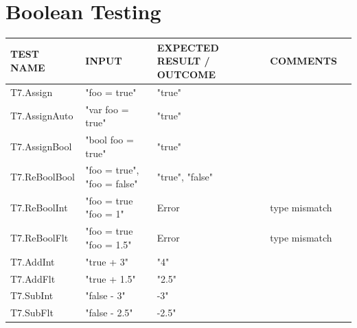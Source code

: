 \documentclass[a4paper, oneside, 11pt]{report}
\begin{document}
    \section{Boolean Testing}
    \label{BoolTest}
    \begin{tabular}{|p{1.5in}|p{1.5in}|p{1.6in}|p{1.6in}|p{2.4in}|}
        \hline
        TEST NAME       & INPUT                     & EXPECTED RESULT / OUTCOME              & COMMENTS                                \\
        \hline
        T7.Assign                         & "foo = true"                            & "true"        &                \\
        \hline
        T7.AssignAuto                     & "var foo = true"                        & "true"        &                \\
        \hline
        T7.AssignBool                     & "bool foo = true"                       & "true"        &                \\
        \hline
        T7.ReBoolBool                     & "foo = true", "foo = false"               & "true", "false" &                \\
        \hline
        T7.ReBoolInt                      & "foo = true "foo = 1"                   & Error         & type mismatch  \\
        \hline
        T7.ReBoolFlt                      & "foo = true "foo = 1.5"                 & Error         & type mismatch  \\
        \hline
        T7.AddInt                         & "true + 3"                              & "4"           &                \\
        \hline
        T7.AddFlt                         & "true + 1.5"                            & "2.5"         &                \\
        \hline
        T7.SubInt                         & "false - 3"                             & -3"           &                \\
        \hline
        T7.SubFlt                         & "false - 2.5"                           & -2.5"         &                \\

\end{tabular}
\end{document}
